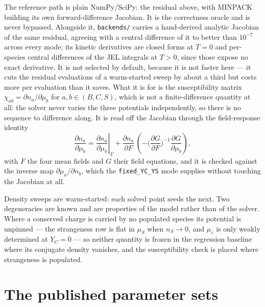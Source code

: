 \documentclass[aps,prc,onecolumn,superscriptaddress,nofootinbib,10pt]{revtex4-2}
\newcommand{\muS}{\mu_S}
\begin{document}
The reference path is plain NumPy/SciPy: the residual above, with MINPACK
building its own forward-difference Jacobian. It is the correctness oracle and
is never bypassed. Alongside it, \texttt{backends/} carries a hand-derived
analytic Jacobian of the same residual, agreeing with a central difference of
it to better than $10^{-7}$ across every mode; its kinetic derivatives
are closed forms at $T=0$ and per-species central differences of the JEL
integrals at $T>0$, since those expose no exact derivative. It is not selected
by default, because it is not faster here --- it cuts the residual evaluations
of a warm-started sweep by about a third but costs more per evaluation than it
saves. What it is for is the susceptibility matrix
$\chi_{ab} = \partial n_a / \partial \mu_b$ for $a,b \in (B, C, S)$, which is
not a finite-difference quantity at all: the solver never varies the three
potentials independently, so there is no sequence to difference along. It is
read off the Jacobian through the field-response identity
%
\begin{equation}
\frac{\partial n_a}{\partial \mu_b}
  = \left.\frac{\partial n_a}{\partial \mu_b}\right|_{F}
  + \frac{\partial n_a}{\partial F}\,
    \left( -\Big(\frac{\partial G}{\partial F}\Big)^{-1}
             \frac{\partial G}{\partial \mu_b} \right),
\label{eq:chi}
\end{equation}
%
with $F$ the four mean fields and $G$ their field equations, and it is checked
against the inverse map $\partial\mu_a/\partial n_b$, which the
\texttt{fixed\_YC\_YS} mode supplies without touching the Jacobian at all.

Density sweeps are warm-started: each solved point seeds the next. Two
degeneracies are known and are properties of the model rather than of the
solver. Where a conserved charge is carried by no populated species its
potential is unpinned --- the strangeness row is flat in $\muS$ when
$n_S \to 0$, and $\mu_e$ is only weakly determined at $Y_C = 0$ --- so
neither quantity is frozen in the regression baseline where its conjugate
density vanishes, and the susceptibility check is placed where strangeness is
populated.

\section{The published parameter sets}
\label{sec:sets}
\end{document}
